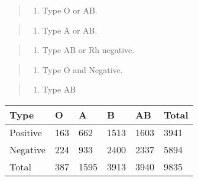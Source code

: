 \documentclass[11pt]{article}
\providecommand{\tightlist}{%
      \setlength{\itemsep}{0pt}\setlength{\parskip}{0pt}}
\begin{document}
\begin{quote}
\begin{enumerate}
\def\labelenumi{\arabic{enumi}.}
\tightlist
\item
  Type O or AB.
\end{enumerate}
\end{quote}

\begin{quote}
\begin{enumerate}
\def\labelenumi{\arabic{enumi}.}
\setcounter{enumi}{1}
\tightlist
\item
  Type A or AB.
\end{enumerate}
\end{quote}

\begin{quote}
\begin{enumerate}
\def\labelenumi{\arabic{enumi}.}
\setcounter{enumi}{2}
\tightlist
\item
  Type AB or Rh negative.
\end{enumerate}
\end{quote}

\begin{quote}
\begin{enumerate}
\def\labelenumi{\arabic{enumi}.}
\setcounter{enumi}{3}
\tightlist
\item
  Type O and Negative.
\end{enumerate}
\end{quote}

\begin{quote}
\begin{enumerate}
\def\labelenumi{\arabic{enumi}.}
\setcounter{enumi}{4}
\tightlist
\item
  Type AB
\end{enumerate}
\end{quote}

    \begin{longtable}[]{@{}llllll@{}}
\toprule
Type & O & A & B & AB & Total\tabularnewline
\midrule
\endhead
Positive & 163 & 662 & 1513 & 1603 & 3941\tabularnewline
Negative & 224 & 933 & 2400 & 2337 & 5894\tabularnewline
Total & 387 & 1595 & 3913 & 3940 & 9835\tabularnewline
\bottomrule
\end{longtable}
\end{document}
